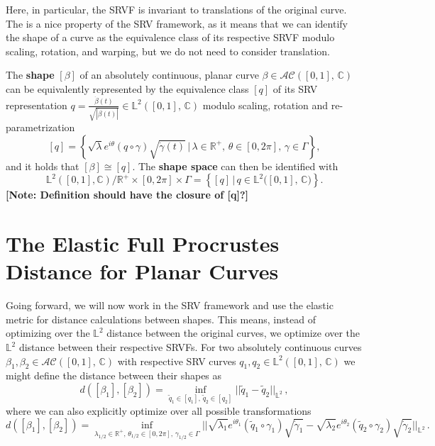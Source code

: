 \noindent Here, in particular, the SRVF is invariant to translations of the original curve.
The is a nice property of the SRV framework, as it means that we can identify the shape of a curve as the equivalence class of its respective SRVF modulo scaling, rotation, and warping, but we do not need to consider translation.

\begin{definition}
  The \textbf{shape} $[\beta]$ of an absolutely continuous, planar curve $\beta \in \mathcal{AC}([0,1],\, \mathbb{C})$ can be equivalently represented by the equivalence class $[q]$ of its SRV representation $q = \frac{\dot\beta(t)}{\sqrt{|\dot\beta(t)|}} \in \mathbb{L}^2([0,1],\,\mathbb{C})$ modulo scaling, rotation and re-parametrization
  $$[q] = \left\{\sqrt\lambda e^{i\theta}(q \circ \gamma) \sqrt{\dot\gamma(t)} \,|\, \lambda \in \mathbb{R}^+,\, \theta \in [0,2\pi],\, \gamma
  \in \Gamma\right\},$$
  and it holds that $[\beta] \cong [q]$. The \textbf{shape space} can then be identified with 
  $$\mathbb{L}^2([0,1], \mathbb{C}) \big/ \mathbb{R}^+ \times [0,2\pi] \times \Gamma = \left\{[q]\,|\,q \in \mathbb{L}^2({[0,1],\,\mathbb{C})}\right\}.$$
  \textbf{[Note: Definition should have the closure of [q]?]}
\end{definition}



\section{The Elastic Full Procrustes Distance for Planar Curves}
\label{theo:proc}
Going forward, we will now work in the SRV framework and use the elastic metric for distance calculations between shapes.
This means, instead of optimizing over the $\mathbb{L}^2$ distance between the original curves, we optimize over the $\mathbb{L}^2$ distance between their respective SRVFs.
For two absolutely continuous curves $\beta_1, \beta_2 \in \mathcal{AC}([0,1],\,\mathbb{C})$ with respective SRV curves $q_1, q_2 \in \mathbb{L}^2([0,1],\,\mathbb{C})$ we might define the distance between their shapes as
$$d([\beta_1], [\beta_2]) = 
  \inf_{\tilde q_1 \in [q_1],\,\tilde q_2 \in [q_2]} || \tilde q_1 - \tilde q_2 ||_{\mathbb{L}^2}\,,$$
where we can also explicitly optimize over all possible transformations
$$d([\beta_1], [\beta_2]) = 
  \inf_{\lambda_{1/2} \in \mathbb{R}^+,\,\theta_{1/2} \in [0,2\pi],\, \gamma_{1/2} \in \Gamma} || \sqrt{\lambda_1} e^{i\theta_1}(\tilde q_1 \circ \gamma_1) \sqrt{\dot\gamma_1} - \sqrt{\lambda_2} e^{i\theta_2}(\tilde q_2 \circ \gamma_2) \sqrt{\dot\gamma_2} ||_{\mathbb{L}^2}\,.$$

